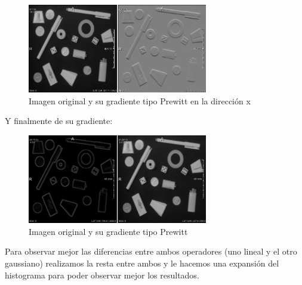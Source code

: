 \documentclass{article}
\begin{document}
\begin{figure}[ht]
\begin{center}
\includegraphics[width=0.7\textwidth]{1Filtros/1_prew_x.png} %
\caption{Imagen original y su gradiente tipo Prewitt en la dirección x}
\label{fg:prew_x}
\end{center}
\end{figure}
\FloatBarrier

Y finalmente de su gradiente:

\begin{figure}[ht]
\begin{center}
\includegraphics[width=0.7\textwidth]{1Filtros/1_prew_grad.png} %
\caption{Imagen original y su gradiente tipo Prewitt}
\label{fg:prewl_grad}
\end{center}
\end{figure}
\FloatBarrier

Para observar mejor las diferencias entre ambos operadores (uno lineal y el otro gaussiano)
realizamos la resta entre ambos y le hacemos una expansión del histograma para poder observar
mejor los resultados.
\end{document}
